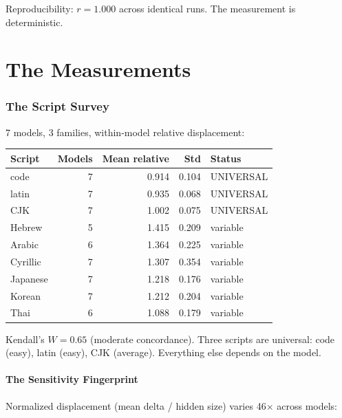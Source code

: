 \documentclass[11pt,a4paper]{article}
\begin{document}
Reproducibility: $r = 1.000$ across identical runs. The measurement is deterministic.

\part{The Measurements}

\section{The Script Survey}

7 models, 3 families, within-model relative displacement:

\begin{center}
\begin{tabular}{lrrrl}
\toprule
\textbf{Script} & \textbf{Models} & \textbf{Mean relative} & \textbf{Std} & \textbf{Status} \\
\midrule
code & 7 & 0.914 & 0.104 & UNIVERSAL \\
latin & 7 & 0.935 & 0.068 & UNIVERSAL \\
CJK & 7 & 1.002 & 0.075 & UNIVERSAL \\
\midrule
Hebrew & 5 & 1.415 & 0.209 & variable \\
Arabic & 6 & 1.364 & 0.225 & variable \\
Cyrillic & 7 & 1.307 & 0.354 & variable \\
Japanese & 7 & 1.218 & 0.176 & variable \\
Korean & 7 & 1.212 & 0.204 & variable \\
Thai & 6 & 1.088 & 0.179 & variable \\
\bottomrule
\end{tabular}
\end{center}

Kendall's $W = 0.65$ (moderate concordance). Three scripts are universal: code (easy), latin (easy), CJK (average). Everything else depends on the model.

\subsection{The Sensitivity Fingerprint}

Normalized displacement (mean delta / hidden size) varies 46$\times$ across models:
\end{document}
